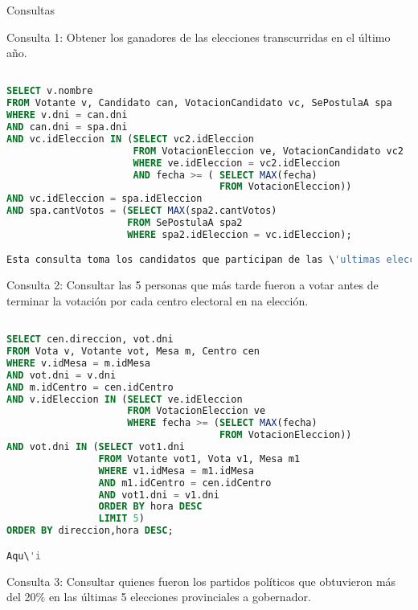 \begin{section}{Consultas}


\noindent Consulta 1: Obtener los ganadores de las elecciones transcurridas en el \'ultimo año.

\begin{lstlisting}[language=SQL, basicstyle=\footnotesize]

SELECT v.nombre
FROM Votante v, Candidato can, VotacionCandidato vc, SePostulaA spa
WHERE v.dni = can.dni
AND can.dni = spa.dni
AND vc.idEleccion IN (SELECT vc2.idEleccion
                      FROM VotacionEleccion ve, VotacionCandidato vc2
                      WHERE ve.idEleccion = vc2.idEleccion
                      AND fecha >= ( SELECT MAX(fecha)
                                     FROM VotacionEleccion))
AND vc.idEleccion = spa.idEleccion
AND spa.cantVotos = (SELECT MAX(spa2.cantVotos)
                     FROM SePostulaA spa2
                     WHERE spa2.idEleccion = vc.idEleccion);

Esta consulta toma los candidatos que participan de las \'ultimas elecciones a partir de la VotacionCandidato y luego los filtra de acuerdo con la cantidad de votos, para as\'i obtener a los ganadores.

\end{lstlisting} 

\noindent Consulta 2: Consultar las 5 personas que m\'as tarde fueron a votar antes de terminar la votaci\'on por cada centro electoral en na elecci\'on.

\begin{lstlisting}[language=SQL, basicstyle=\footnotesize]

SELECT cen.direccion, vot.dni
FROM Vota v, Votante vot, Mesa m, Centro cen
WHERE v.idMesa = m.idMesa
AND vot.dni = v.dni
AND m.idCentro = cen.idCentro
AND v.idEleccion IN (SELECT ve.idEleccion
                     FROM VotacionEleccion ve
                     WHERE fecha >= (SELECT MAX(fecha)
                                     FROM VotacionEleccion))
AND vot.dni IN (SELECT vot1.dni
                FROM Votante vot1, Vota v1, Mesa m1
                WHERE v1.idMesa = m1.idMesa
                AND m1.idCentro = cen.idCentro
                AND vot1.dni = v1.dni
                ORDER BY hora DESC
                LIMIT 5)
ORDER BY direccion,hora DESC;

Aqu\'i
\end{lstlisting} 

\noindent Consulta 3: Consultar quienes fueron los partidos pol\'iticos que obtuvieron m\'as del 20$\%$ en las \'ultimas 5 elecciones provinciales a gobernador.




\end{section}
